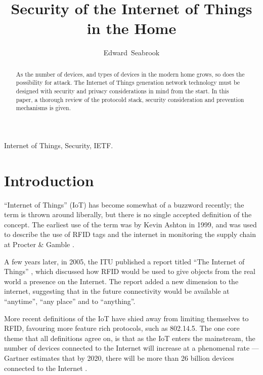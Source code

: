 \documentclass[12pt,journal,compsoc]{IEEEtran}
\begin{document}
\title{Security of the Internet of Things in the Home}
\author{Edward~Seabrook }

\maketitle


\begin{abstract}
As the number of devices, and types of devices in the modern home grows, so
does the possibility for attack. The Internet of Things generation network
technology must be designed with security and privacy considerations in mind
from the start. In this paper, a thorough review of the protocold stack,
security consideration and prevention mechanisms is given. 
\end{abstract}

\begin{IEEEkeywords}
Internet of Things, Security, IETF.
\end{IEEEkeywords}

\IEEEpeerreviewmaketitle

\section{Introduction}
 ``Internet of Things'' (IoT) has become somewhat of a
buzzword recently; the term is thrown around liberally, but there is no single
accepted definition of the concept. The earliest use of the term was by Kevin
Ashton in 1999, and was used to describe the use of RFID tags and the internet
in monitoring the supply chain at Procter \& Gamble \cite{Ashton2009}. 

A few years later, in 2005, the ITU published a report titled ``The Internet of
Things'' \cite{ITU_IoT}, which discussed how RFID would be used to give objects from the real
world a presence on the Internet. The report added a new dimension to the
internet, suggesting that in the future connectivity would be available at
``anytime'', ``any place'' and to ``anything''.

More recent definitions of the IoT have shied away from limiting themselves to
RFID, favouring more feature rich protocols, such as 802.14.5. The one core
theme that all definitions agree on, is that as the IoT enters the mainstream,
the number of devices connected to the Internet will increase at a phenomenal
rate — Gartner estimates that by 2020, there will be more than 26 billion
devices connected to the Internet \cite{Gartner2014}. 
\end{document}
